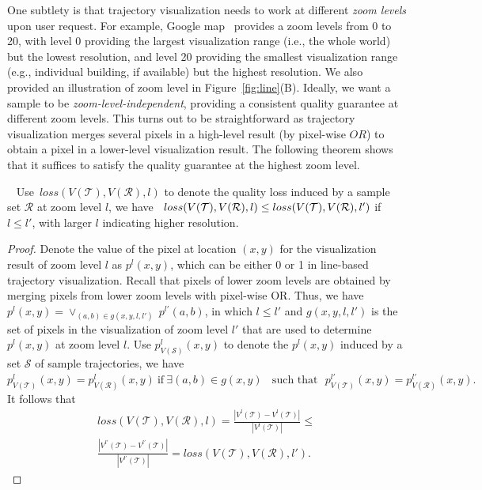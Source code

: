 One subtlety is that trajectory visualization needs to work at different \textit{zoom levels} upon user request. For example, Google map~\cite{googlemap} provides a zoom levels from 0 to 20, with level 0 providing the largest visualization range (i.e., the whole world) but the lowest resolution, and level 20 providing the smallest visualization range (e.g., individual building, if available) but the highest resolution. We also provided an illustration of zoom level in Figure~\ref{fig:line}(B). Ideally, we want a sample to be \textit{zoom-level-independent}, providing a consistent quality guarantee at different zoom levels. This turns out to be straightforward as trajectory visualization merges several pixels in a high-level result (by pixel-wise $OR$) to obtain a pixel in a lower-level visualization result. The following theorem shows that it suffices to satisfy the quality guarantee at the highest zoom level.
\begin{theorem}~\label{the:level}
	Use~$loss(V(\mathcal{T}), V(\mathcal{R}), l)$ to denote the quality loss induced by a sample set $\mathcal{R}$ at zoom level $l$, we have~ $loss(V(\mathcal{T}), V(\mathcal{R}), l) \\ \le loss(V(\mathcal{T}), V(\mathcal{R}), l')$ if $l\le l'$, with larger $l$ indicating higher resolution.
\end{theorem}

\begin{proof}
	Denote the value of the pixel at location $(x,y)$ for the visualization result of zoom level $l$ as $p^l(x,y)$, which can be either 0 or 1 in line-based trajectory visualization. Recall that pixels of lower zoom levels are obtained by merging pixels from lower zoom levels with pixel-wise OR. Thus, we have $p^l(x,y)=\vee_{(a,b)\in g(x,y,l,l')} \ p^{l'}(a,b)$, in which  $l\le l'$ and $g(x,y,l,l')$ is the set of pixels in the visualization of zoom level $l'$ that are used to determine $p^l(x,y)$ at zoom level $l$. Use $p^l_{V(\mathcal{S})}(x,y)$ to denote the $p^l(x,y)$ induced by a set $\mathcal{S}$ of sample trajectories, we have
	$p^l_{V(\mathcal{T})}(x,y)=p^l_{V(\mathcal{R})}(x,y) \ \text{if} \ \exists (a,b)\in g(x,y) \ \text{~~such that~~} p^{l'}_{V(\mathcal{T})}(x,y)=p^{l'}_{V(\mathcal{R})}(x,y).$ It follows that
	\begin{align} \nonumber
	loss(V(\mathcal{T}),V(\mathcal{R}),l)=   \frac{|V^l(\mathcal{T})-V^l(\mathcal{T})|}{|V^l(\mathcal{T})|}\le \\  \frac{|V^{l'}(\mathcal{T})-V^{l'}(\mathcal{T})|}{|V^{l'}(\mathcal{T})|}=loss(V(\mathcal{T}), V(\mathcal{R}), l').
	\end{align}

\end{proof}

